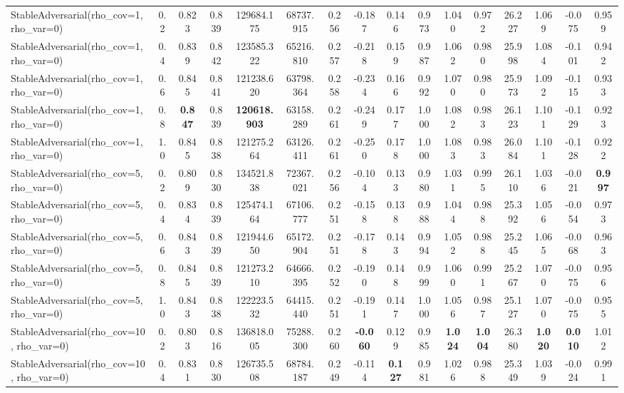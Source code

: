 \documentclass[11pt]{article}
\theoremstyle{plain}
\theoremstyle{definition}
\newcommand{\1}{\mathbf{1}}
\begin{document}
\begin{table}[!h]
{\begin{tabular}{lccccccccccccccc}
StableAdversarial(rho\_cov=1, rho\_var=0) & 0.2 & 0.823 & 0.839 & 129684.175 & 68737.915 & 0.256 & -0.187 & 0.146 & 0.973 & 1.040 & 0.972 & 26.227 & 1.069 & -0.075 & 0.959 \\
StableAdversarial(rho\_cov=1, rho\_var=0) & 0.4 & 0.839 & 0.842 & 123585.322 & 65216.810 & 0.257 & -0.218 & 0.159 & 0.987 & 1.062 & 0.980 & 25.998 & 1.084 & -0.101 & 0.942 \\
StableAdversarial(rho\_cov=1, rho\_var=0) & 0.6 & 0.845 & 0.841 & 121238.620 & 63798.364 & 0.258 & -0.234 & 0.166 & 0.992 & 1.070 & 0.980 & 25.973 & 1.092 & -0.115 & 0.933 \\
StableAdversarial(rho\_cov=1, rho\_var=0) & 0.8 & \textbf{0.847} & 0.839 & \textbf{120618.903} & 63158.289 & 0.261 & -0.249 & 0.177 & 1.000 & 1.082 & 0.983 & 26.123 & 1.101 & -0.129 & 0.923 \\
StableAdversarial(rho\_cov=1, rho\_var=0) & 1.0 & 0.845 & 0.838 & 121275.264 & 63126.411 & 0.261 & -0.250 & 0.178 & 1.000 & 1.083 & 0.983 & 26.084 & 1.101 & -0.128 & 0.922 \\
StableAdversarial(rho\_cov=5, rho\_var=0) & 0.2 & 0.809 & 0.830 & 134521.838 & 72367.021 & 0.256 & -0.104 & 0.133 & 0.980 & 1.031 & 0.995 & 26.110 & 1.036 & -0.021 & \textbf{0.997} \\
StableAdversarial(rho\_cov=5, rho\_var=0) & 0.4 & 0.834 & 0.839 & 125474.164 & 67106.777 & 0.251 & -0.158 & 0.138 & 0.988 & 1.044 & 0.988 & 25.392 & 1.056 & -0.054 & 0.973 \\
StableAdversarial(rho\_cov=5, rho\_var=0) & 0.6 & 0.843 & 0.839 & 121944.650 & 65172.904 & 0.251 & -0.178 & 0.143 & 0.994 & 1.052 & 0.988 & 25.245 & 1.065 & -0.068 & 0.963 \\
StableAdversarial(rho\_cov=5, rho\_var=0) & 0.8 & 0.845 & 0.839 & 121273.210 & 64666.395 & 0.252 & -0.190 & 0.148 & 0.999 & 1.060 & 0.991 & 25.267 & 1.070 & -0.075 & 0.956 \\
StableAdversarial(rho\_cov=5, rho\_var=0) & 1.0 & 0.843 & 0.838 & 122223.532 & 64415.440 & 0.251 & -0.191 & 0.147 & 1.000 & 1.056 & 0.987 & 25.127 & 1.070 & -0.075 & 0.955 \\
StableAdversarial(rho\_cov=10, rho\_var=0) & 0.2 & 0.803 & 0.816 & 136818.005 & 75288.300 & 0.260 & \textbf{-0.060} & 0.129 & 0.985 & \textbf{1.024} & \textbf{1.004} & 26.380 & \textbf{1.020} & \textbf{0.010} & 1.012 \\
StableAdversarial(rho\_cov=10, rho\_var=0) & 0.4 & 0.831 & 0.830 & 126735.508 & 68784.187 & 0.249 & -0.114 & \textbf{0.127} & 0.981 & 1.026 & 0.988 & 25.349 & 1.039 & -0.024 & 0.991 \\

\end{tabular}}
\end{table}
\end{document}
